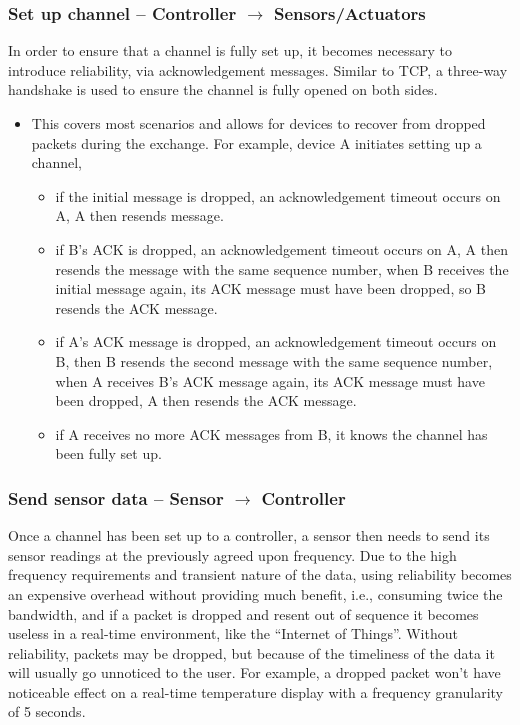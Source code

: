 
\subsubsection{Set up channel -- Controller $\rightarrow$ Sensors/Actuators} %
\label{ssub:set_up_channel}
In order to ensure that a channel is fully set up, it becomes necessary to introduce reliability, via acknowledgement messages. Similar to TCP, a three-way handshake is used to ensure the channel is fully opened on both sides.

\begin{itemize}
 	\item This covers most scenarios and allows for devices to recover from dropped packets during the exchange. For example, device A initiates setting up a channel,
 	\begin{itemize}
 		\item if the initial message is dropped, an acknowledgement timeout occurs on A, A then resends message.
 		\item if B's ACK is dropped, an acknowledgement timeout occurs on A, A then resends the message with the same sequence number, when B receives the initial message again, its ACK message must have been dropped, so B resends the ACK message.
 		\item if A's ACK message is dropped, an acknowledgement timeout occurs on B, then B resends the second message with the same sequence number, when A receives B's ACK message again, its ACK message must have been dropped, A then resends the ACK message.
 		\item if A receives no more ACK messages from B, it knows the channel has been fully set up.
 	\end{itemize}
 \end{itemize} 

\subsubsection{Send sensor data -- Sensor $\rightarrow$ Controller} %
\label{ssub:send_sensor_data}
Once a channel has been set up to a controller, a sensor then needs to send its sensor readings at the previously agreed upon frequency. 
Due to the high frequency requirements and transient nature of the data, using reliability becomes an expensive overhead without providing much benefit, i.e., consuming twice the bandwidth, and if a packet is dropped and resent out of sequence it becomes useless in a real-time environment, like the ``Internet of Things''.  
Without reliability, packets may be dropped, but because of the timeliness of the data it will usually go unnoticed to the user. For example, a dropped packet won't have noticeable effect on a real-time temperature display with a frequency granularity of 5 seconds.

